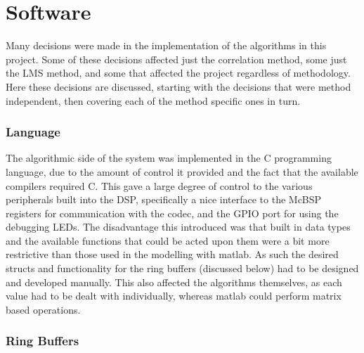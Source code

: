 \section{Software}
Many decisions were made in the implementation of the algorithms in this project.
Some of these decisions affected just the correlation method, some just the LMS method, and some that affected the project regardless of methodology.
Here these decisions are discussed, starting with the decisions that were method independent, then covering each of the method specific ones in turn.

\subsubsection{Language}

The algorithmic side of the system was implemented in the C programming language, due to the amount of control it provided and the fact that the available compilers required C.
This gave a large degree of control to the various peripherals built into the DSP, specifically a nice interface to the McBSP registers for communication with the codec, and the GPIO port for using the debugging LEDs.
The disadvantage this introduced was that built in data types and the available functions that could be acted upon them were a bit more restrictive than those used in the modelling with matlab.
As such the desired structs and functionality for the ring buffers (discussed below) had to be designed and developed manually.
This also affected the algorithms themselves, as each value had to be dealt with individually, whereas matlab could perform matrix based operations.

\subsubsection{Ring Buffers}

